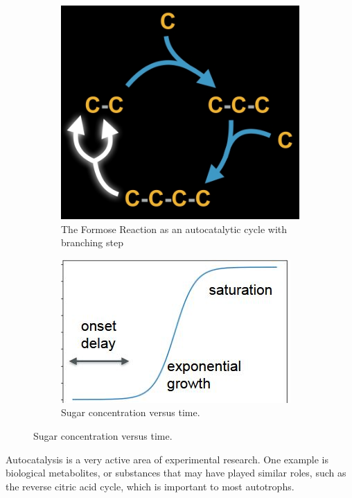 \documentclass[]{article}
\begin{document}
\begin{figure}[H]
	\begin{subfigure}[t]{0.45\textwidth}
		\caption{The Formose Reaction as an autocatalytic cycle with branching step}\label{fig:Formose1}
		\includegraphics[width=\textwidth]{Formose1}
	\end{subfigure}
	\begin{subfigure}[t]{0.5\textwidth}
		\caption{Sugar concentration versus time.}\label{fig:Formose2}
		\includegraphics[width=\textwidth]{Formose2}
	\end{subfigure}
\end{figure}

 Autocatalysis is a very active area of experimental research. One example is biological metabolites, or substances that may have played similar roles, such as the reverse citric acid cycle, which is important to most autotrophs. 
\end{document}
